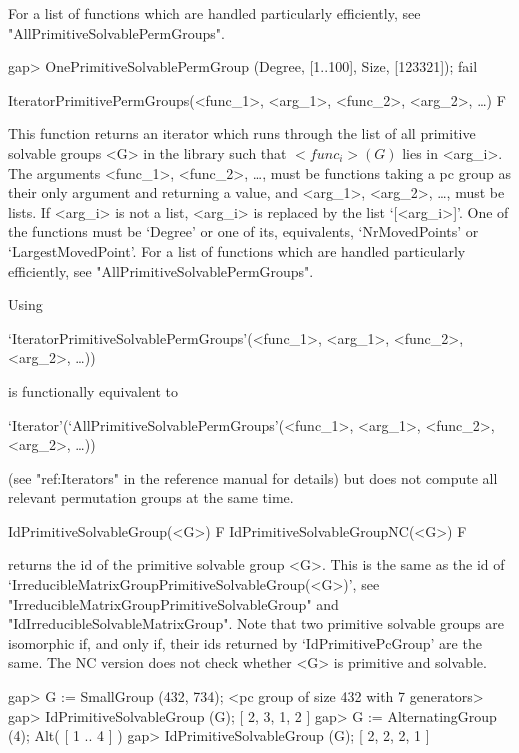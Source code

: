 For a list of functions which are handled particularly efficiently, see
"AllPrimitiveSolvablePermGroups".

\beginexample
gap> OnePrimitiveSolvablePermGroup (Degree, [1..100], Size, [123321]);
fail
\endexample

\>IteratorPrimitivePermGroups(<func_1>, <arg_1>, <func_2>, <arg_2>, \dots) F

This function returns an iterator which runs through the list of all primitive solvable
groups <G> in the  {\IRREDSOL} library such that
$<func_i>(G)$ lies in <arg_i>. The arguments <func_1>, <func_2>, \dots,
must be {\GAP} functions taking a pc group as their only argument and returning 
a value, and <arg_1>, <arg_2>, \dots, 
must be lists. If <arg_i> is not a list, <arg_i> is replaced by the list `[<arg_i>]'.
One of the functions must be `Degree' or one of its, equivalents, `NrMovedPoints' 
or `LargestMovedPoint'.
For a list of functions which are handled particularly efficiently, see
"AllPrimitiveSolvablePermGroups".

Using 

`IteratorPrimitiveSolvablePermGroups'(<func_1>, <arg_1>, <func_2>, <arg_2>, \dots)) 

is functionally equivalent to 

`Iterator'(`AllPrimitiveSolvablePermGroups'(<func_1>, <arg_1>, <func_2>, <arg_2>, \dots))

(see "ref:Iterators" in the {\GAP} reference manual for details) but does not 
compute all relevant permutation groups at the same time. 



\>IdPrimitiveSolvableGroup(<G>) F
\>IdPrimitiveSolvableGroupNC(<G>) F

returns the id of the primitive solvable group <G>. This is the same as
the id of `IrreducibleMatrixGroupPrimitiveSolvableGroup(<G>)', see "IrreducibleMatrixGroupPrimitiveSolvableGroup" and "IdIrreducibleSolvableMatrixGroup".
Note that two primitive solvable groups are isomorphic if, and only if, their
ids returned by `IdPrimitivePcGroup' are the same. The NC version does not
check whether <G> is primitive and solvable.

\beginexample
gap> G := SmallGroup (432, 734);
<pc group of size 432 with 7 generators>
gap> IdPrimitiveSolvableGroup (G);
[ 2, 3, 1, 2 ]
gap> G := AlternatingGroup (4);
Alt( [ 1 .. 4 ] )
gap> IdPrimitiveSolvableGroup (G);
[ 2, 2, 2, 1 ]
\endexample

